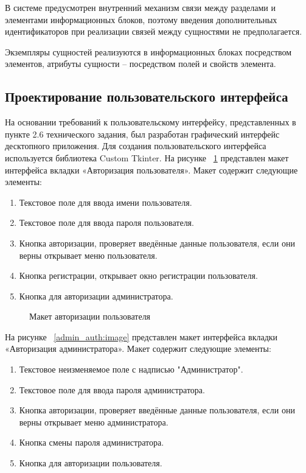 В системе предусмотрен внутренний механизм связи между разделами и элементами информационных блоков, поэтому введения дополнительных идентификаторов при реализации связей между сущностями не предполагается.

Экземпляры сущностей реализуются в информационных блоках посредством элементов, атрибуты сущности – посредством полей и свойств элемента. 

\subsection{Проектирование пользовательского интерфейса}

На основании требований к пользовательскому интерфейсу, представленных в пункте 2.6 технического задания, был разработан графический интерфейс десктопного приложения. Для создания пользовательского
интерфейса используется библиотека Custom Tkinter.
На рисунке ~\ref{user_auth:image} представлен макет интерфейса вкладки «Авторизация пользователя». Макет содержит следующие элементы:
\begin{enumerate}
	\item Текстовое поле для ввода имени пользователя.
	\item Текстовое поле для ввода пароля пользователя.
	\item Кнопка авторизации, проверяет введённые данные пользователя, если они верны открывает меню пользователя.
	\item Кнопка регистрации, открывает окно регистрации пользователя.
	\item Кнопка для авторизации администратора. 
\end{enumerate}

\begin{figure}[H]
	\caption{Макет авторизации пользователя}
	\label{user_auth:image}
\end{figure}

На рисунке ~\ref{admin_auth:image} представлен макет интерфейса вкладки «Авторизация администратора». Макет содержит следующие элементы:
\begin{enumerate}
	\item Текстовое неизменяемое поле с надписью "Администратор".
	\item Текстовое поле для ввода пароля администратора.
	\item Кнопка авторизации, проверяет введённые данные пользователя, если они верны открывает меню администратора.
	\item Кнопка смены пароля администратора.
	\item Кнопка для авторизации пользователя. 
\end{enumerate}


